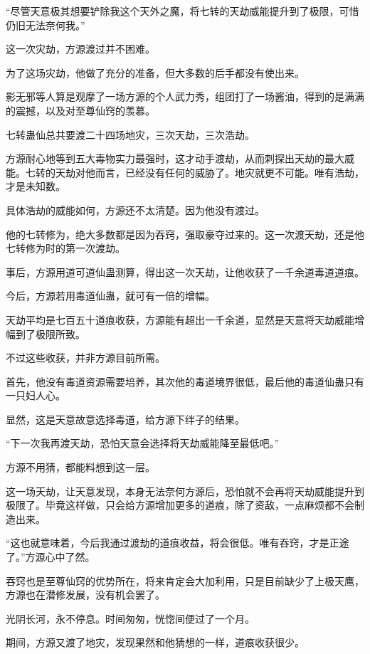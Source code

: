 
\begin{this_body}

“尽管天意极其想要铲除我这个天外之魔，将七转的天劫威能提升到了极限，可惜仍旧无法奈何我。”

这一次灾劫，方源渡过并不困难。

为了这场灾劫，他做了充分的准备，但大多数的后手都没有使出来。

影无邪等人算是观摩了一场方源的个人武力秀，组团打了一场酱油，得到的是满满的震撼，以及对至尊仙窍的羡慕。

七转蛊仙总共要渡二十四场地灾，三次天劫，三次浩劫。

方源耐心地等到五大毒物实力最强时，这才动手渡劫，从而刺探出天劫的最大威能。七转的天劫对他而言，已经没有任何的威胁了。地灾就更不可能。唯有浩劫，才是未知数。

具体浩劫的威能如何，方源还不太清楚。因为他没有渡过。

他的七转修为，绝大多数都是因为吞窍，强取豪夺过来的。这一次渡天劫，还是他七转修为时的第一次渡劫。

事后，方源用道可道仙蛊测算，得出这一次天劫，让他收获了一千余道毒道道痕。

今后，方源若用毒道仙蛊，就可有一倍的增幅。

天劫平均是七百五十道痕收获，方源能有超出一千余道，显然是天意将天劫威能增幅到了极限所致。

不过这些收获，并非方源目前所需。

首先，他没有毒道资源需要培养，其次他的毒道境界很低，最后他的毒道仙蛊只有一只妇人心。

显然，这是天意故意选择毒道，给方源下绊子的结果。

“下一次我再渡天劫，恐怕天意会选择将天劫威能降至最低吧。”

方源不用猜，都能料想到这一层。

这一场天劫，让天意发现，本身无法奈何方源后，恐怕就不会再将天劫威能提升到极限了。毕竟这样做，只会给方源增加更多的道痕，除了资敌，一点麻烦都不会制造出来。

“这也就意味着，今后我通过渡劫的道痕收益，将会很低。唯有吞窍，才是正途了。”方源心中了然。

吞窍也是至尊仙窍的优势所在，将来肯定会大加利用，只是目前缺少了上极天鹰，方源也在潜修发展，没有机会罢了。

光阴长河，永不停息。时间匆匆，恍惚间便过了一个月。

期间，方源又渡了地灾，发现果然和他猜想的一样，道痕收获很少。


\end{this_body}
